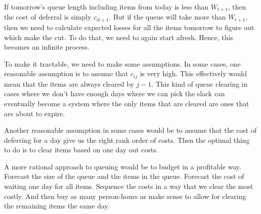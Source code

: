 \documentclass[12pt, letterpaper]{article}
\begin{document}
If tomorrow's queue length including items from today is less than $W_{t+1}$, then the cost of deferral is simply $c_{it+1}$. But if the queue will take more than $W_{t+1}$, then we need to calculate expected losses for all the items tomorrow to figure out which make the cut. To do that, we need to again start afresh. Hence, this becomes an infinite process.

To make it tractable, we need to make some assumptions. In some cases, one reasonable assumption is to assume that $c_{ij}$ is very high. This effectively would mean that the items are always cleared by $j-1$. This kind of queue clearing in cases where we don't have enough days where we can pick the slack can eventually become a system where the only items that are cleared are ones that are about to expire. 

Another reasonable assumption in some cases would be to assume that the cost of deferring for a day give us the right rank order of costs. Then the optimal thing to do is to clear items based on one day out costs.

A more rational approach to queuing would be to budget in a profitable way. Forecast the size of the queue and the items in the queue. Forecast the cost of waiting one day for all items. Sequence the costs in a way that we clear the most costly. And then buy as many person-hours as make sense to allow for clearing the remaining items the same day.
\end{document}
